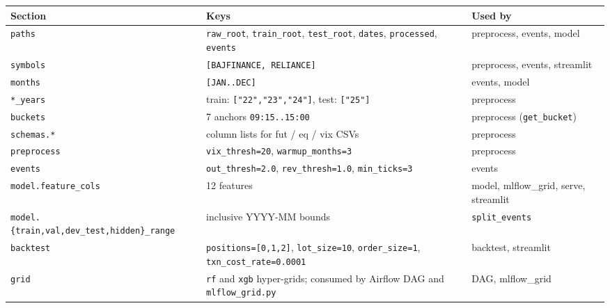 \documentclass[11pt,a4paper]{article}
\begin{document}
\begin{tabularx}{\linewidth}{@{}lXl@{}}
\toprule
\textbf{Section} & \textbf{Keys} & \textbf{Used by} \\
\midrule
\texttt{paths}          & \texttt{raw\_root}, \texttt{train\_root}, \texttt{test\_root}, \texttt{dates}, \texttt{processed}, \texttt{events}                       & preprocess, events, model \\
\texttt{symbols}        & \texttt{[BAJFINANCE, RELIANCE]}                                                                                                       & preprocess, events, streamlit \\
\texttt{months}         & \texttt{[JAN..DEC]}                                                                                                                  & events, model \\
\texttt{*\_years}       & train: \texttt{["22","23","24"]}, test: \texttt{["25"]}                                                                              & preprocess \\
\texttt{buckets}        & 7 anchors \texttt{09:15..15:00}                                                                                                      & preprocess (\texttt{get\_bucket}) \\
\texttt{schemas.*}      & column lists for fut / eq / vix CSVs                                                                                                 & preprocess \\
\texttt{preprocess}     & \texttt{vix\_thresh=20}, \texttt{warmup\_months=3}                                                                                   & preprocess \\
\texttt{events}         & \texttt{out\_thresh=2.0}, \texttt{rev\_thresh=1.0}, \texttt{min\_ticks=3}                                                            & events \\
\texttt{model.feature\_cols} & 12 features                                                                                                                     & model, mlflow\_grid, serve, streamlit \\
\texttt{model.\{train,val,dev\_test,hidden\}\_range} & inclusive YYYY-MM bounds                                                                                & \texttt{split\_events} \\
\texttt{backtest}       & \texttt{positions=[0,1,2]}, \texttt{lot\_size=10}, \texttt{order\_size=1}, \texttt{txn\_cost\_rate=0.0001}                            & backtest, streamlit \\
\texttt{grid}           & \texttt{rf} and \texttt{xgb} hyper-grids; consumed by Airflow DAG and \texttt{mlflow\_grid.py}                                       & DAG, mlflow\_grid \\
\bottomrule
\end{tabularx}
\end{document}
